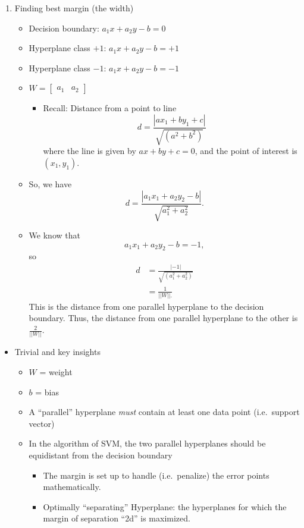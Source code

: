 \documentclass{article}
\begin{document}
\begin{enumerate}
\begin{itemize}
    \end{itemize}
    \item Finding best margin (the width)
    \begin{itemize}
        \item Decision boundary: $a_1x + a_2y - b = 0$
        \item Hyperplane class $+1$: $a_1x + a_2y - b = +1$
        \item Hyperplane class $-1$: $a_1x + a_2y - b = -1$
        \item $W = \begin{bmatrix} a_1 & a_2 \end{bmatrix}$
        \begin{itemize}
            \item Recall: Distance from a point to line \[d = \frac{|ax_1 + by_1 + c|}{\sqrt{(a^2 + b^2)}}\] where the line is given by $ax + by + c = 0$, and the point of interest is $(x_1, y_1)$.
        \end{itemize}
        \item So, we have \[d = \frac{|a_1x_1 + a_2y_2 - b|}{\sqrt{a_1^2 + a_2^2}}.\]
        \item We know that \[a_1x_1 + a_2y_2 - b = -1,\] so 
        \begin{align*} d &= \frac{|-1|}{\sqrt{(a_1^2 + a_2^2)}} \\ &= \frac{1}{||W||.} \end{align*} This is the distance from one parallel hyperplane to the decision boundary. Thus, the distance from one parallel hyperplane to the other is $\frac{2}{||W||}$.
    \end{itemize}
\end{enumerate}
\begin{itemize}
    \item Trivial and key insights
    \begin{itemize}
        \item $W$ = weight
        \item $b$ = bias
        \item A ``parallel'' hyperplane \emph{must} contain at least one data point (i.e.\ support vector)
        \item In the algorithm of SVM, the two parallel hyperplanes should be equidistant from the decision boundary
        \begin{itemize}
            \item The margin is set up to handle (i.e.\ penalize) the error points mathematically.
            \item Optimally ``separating'' Hyperplane: the hyperplanes for which the margin of separation ``2d'' is maximized.
        \end{itemize}
    \end{itemize}
\end{itemize}
\end{document}
